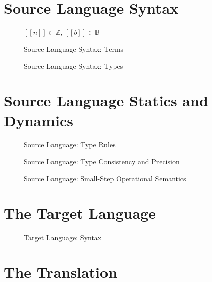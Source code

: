 \documentclass[11pt]{article}
\begin{document}
\section{Source Language Syntax}

\begin{figure}
$[[n]] \in \mathbb{Z}$, $[[b]]\in\mathbb{B}$

\caption{Source Language Syntax: Terms}
\label{fig:term-syntax}
\end{figure}

\begin{figure}


\caption{Source Language Syntax: Types}
\label{fig:type-syntax}
\end{figure} 

\section{Source Language Statics and Dynamics}

\begin{figure}
\ottdefnHastype{} 
\caption{Source Language: Type Rules}
\label{fig:source-typerules}
\end{figure} 

\begin{figure}
    \ottdefnConsistent{} 
    \ottdefnMeet{}
    \caption{Source Language: Type Consistency and Precision}
    \label{fig:source-precision}
    \end{figure} 

\begin{figure}
\ottdefnsSemantics{} 
\caption{Source Language: Small-Step Operational Semantics}
\label{fig:source-semantics}
\end{figure}

\section{The Target Language}

\begin{figure}
    \caption{Target Language: Syntax}
    \label{fig:target-syntax}
    \end{figure}

\section{The Translation}
\end{document}
